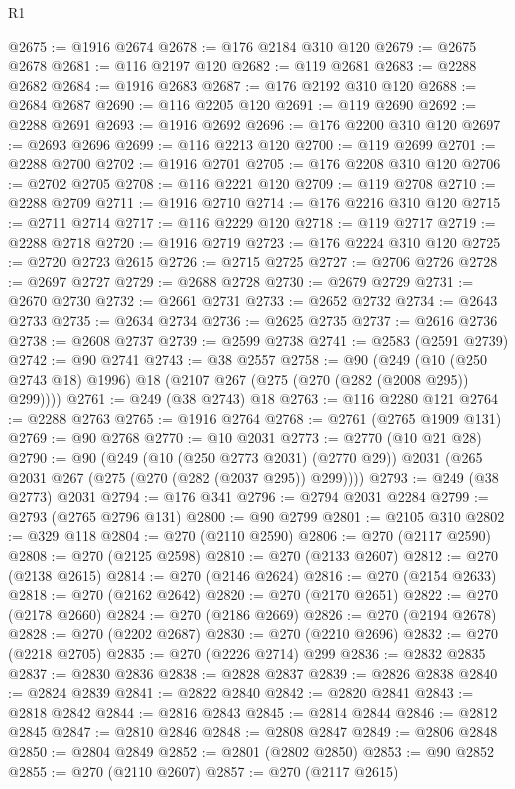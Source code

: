 \begin{lexlean}{R1}
\begin{coremodule}
@2675 := @1916 @2674
@2678 := @176 @2184 @310 @120
@2679 := @2675 @2678
@2681 := @116 @2197 @120
@2682 := @119 @2681
@2683 := @2288 @2682
@2684 := @1916 @2683
@2687 := @176 @2192 @310 @120
@2688 := @2684 @2687
@2690 := @116 @2205 @120
@2691 := @119 @2690
@2692 := @2288 @2691
@2693 := @1916 @2692
@2696 := @176 @2200 @310 @120
@2697 := @2693 @2696
@2699 := @116 @2213 @120
@2700 := @119 @2699
@2701 := @2288 @2700
@2702 := @1916 @2701
@2705 := @176 @2208 @310 @120
@2706 := @2702 @2705
@2708 := @116 @2221 @120
@2709 := @119 @2708
@2710 := @2288 @2709
@2711 := @1916 @2710
@2714 := @176 @2216 @310 @120
@2715 := @2711 @2714
@2717 := @116 @2229 @120
@2718 := @119 @2717
@2719 := @2288 @2718
@2720 := @1916 @2719
@2723 := @176 @2224 @310 @120
@2725 := @2720 @2723 @2615
@2726 := @2715 @2725
@2727 := @2706 @2726
@2728 := @2697 @2727
@2729 := @2688 @2728
@2730 := @2679 @2729
@2731 := @2670 @2730
@2732 := @2661 @2731
@2733 := @2652 @2732
@2734 := @2643 @2733
@2735 := @2634 @2734
@2736 := @2625 @2735
@2737 := @2616 @2736
@2738 := @2608 @2737
@2739 := @2599 @2738
@2741 := @2583 (@2591 @2739)
@2742 := @90 @2741
@2743 := @38 @2557
@2758 := @90
    (@249 (@10 (@250 @2743 @18) @1996) @18 (@2107 @267 (@275 (@270 (@282 (@2008 @295)) @299))))
@2761 := @249 (@38 @2743) @18
@2763 := @116 @2280 @121
@2764 := @2288 @2763
@2765 := @1916 @2764
@2768 := @2761 (@2765 @1909 @131)
@2769 := @90 @2768
@2770 := @10 @2031
@2773 := @2770 (@10 @21 @28)
@2790 := @90
    (@249
      (@10 (@250 @2773 @2031) (@2770 @29))
      @2031
      (@265 @2031 @267 (@275 (@270 (@282 (@2037 @295)) @299))))
@2793 := @249 (@38 @2773) @2031
@2794 := @176 @341
@2796 := @2794 @2031 @2284
@2799 := @2793 (@2765 @2796 @131)
@2800 := @90 @2799
@2801 := @2105 @310
@2802 := @329 @118
@2804 := @270 (@2110 @2590)
@2806 := @270 (@2117 @2590)
@2808 := @270 (@2125 @2598)
@2810 := @270 (@2133 @2607)
@2812 := @270 (@2138 @2615)
@2814 := @270 (@2146 @2624)
@2816 := @270 (@2154 @2633)
@2818 := @270 (@2162 @2642)
@2820 := @270 (@2170 @2651)
@2822 := @270 (@2178 @2660)
@2824 := @270 (@2186 @2669)
@2826 := @270 (@2194 @2678)
@2828 := @270 (@2202 @2687)
@2830 := @270 (@2210 @2696)
@2832 := @270 (@2218 @2705)
@2835 := @270 (@2226 @2714) @299
@2836 := @2832 @2835
@2837 := @2830 @2836
@2838 := @2828 @2837
@2839 := @2826 @2838
@2840 := @2824 @2839
@2841 := @2822 @2840
@2842 := @2820 @2841
@2843 := @2818 @2842
@2844 := @2816 @2843
@2845 := @2814 @2844
@2846 := @2812 @2845
@2847 := @2810 @2846
@2848 := @2808 @2847
@2849 := @2806 @2848
@2850 := @2804 @2849
@2852 := @2801 (@2802 @2850)
@2853 := @90 @2852
@2855 := @270 (@2110 @2607)
@2857 := @270 (@2117 @2615)

\end{coremodule}
\end{lexlean}
